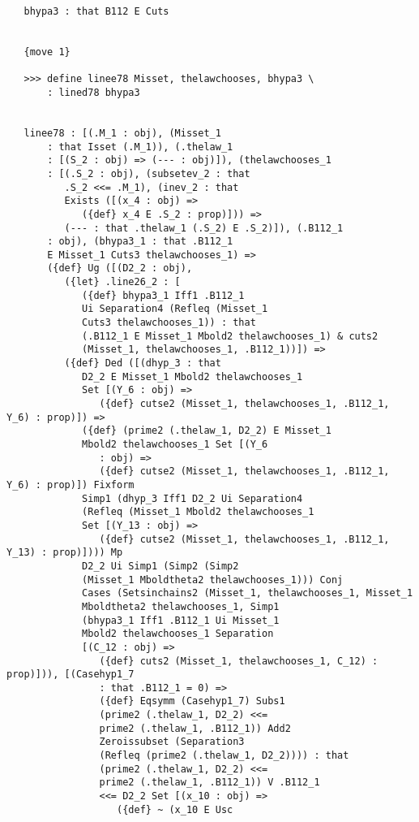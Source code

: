 \documentclass[12pt]{article}
\begin{document}
\begin{verbatim}
   bhypa3 : that B112 E Cuts


   {move 1}

   >>> define linee78 Misset, thelawchooses, bhypa3 \
       : lined78 bhypa3


   linee78 : [(.M_1 : obj), (Misset_1 
       : that Isset (.M_1)), (.thelaw_1 
       : [(S_2 : obj) => (--- : obj)]), (thelawchooses_1 
       : [(.S_2 : obj), (subsetev_2 : that 
          .S_2 <<= .M_1), (inev_2 : that 
          Exists ([(x_4 : obj) => 
             ({def} x_4 E .S_2 : prop)])) => 
          (--- : that .thelaw_1 (.S_2) E .S_2)]), (.B112_1 
       : obj), (bhypa3_1 : that .B112_1 
       E Misset_1 Cuts3 thelawchooses_1) => 
       ({def} Ug ([(D2_2 : obj), 
          ({let} .line26_2 : [
             ({def} bhypa3_1 Iff1 .B112_1 
             Ui Separation4 (Refleq (Misset_1 
             Cuts3 thelawchooses_1)) : that 
             (.B112_1 E Misset_1 Mbold2 thelawchooses_1) & cuts2 
             (Misset_1, thelawchooses_1, .B112_1))]) => 
          ({def} Ded ([(dhyp_3 : that 
             D2_2 E Misset_1 Mbold2 thelawchooses_1 
             Set [(Y_6 : obj) => 
                ({def} cutse2 (Misset_1, thelawchooses_1, .B112_1, Y_6) : prop)]) => 
             ({def} (prime2 (.thelaw_1, D2_2) E Misset_1 
             Mbold2 thelawchooses_1 Set [(Y_6 
                : obj) => 
                ({def} cutse2 (Misset_1, thelawchooses_1, .B112_1, Y_6) : prop)]) Fixform 
             Simp1 (dhyp_3 Iff1 D2_2 Ui Separation4 
             (Refleq (Misset_1 Mbold2 thelawchooses_1 
             Set [(Y_13 : obj) => 
                ({def} cutse2 (Misset_1, thelawchooses_1, .B112_1, Y_13) : prop)]))) Mp 
             D2_2 Ui Simp1 (Simp2 (Simp2 
             (Misset_1 Mboldtheta2 thelawchooses_1))) Conj 
             Cases (Setsinchains2 (Misset_1, thelawchooses_1, Misset_1 
             Mboldtheta2 thelawchooses_1, Simp1 
             (bhypa3_1 Iff1 .B112_1 Ui Misset_1 
             Mbold2 thelawchooses_1 Separation 
             [(C_12 : obj) => 
                ({def} cuts2 (Misset_1, thelawchooses_1, C_12) : prop)])), [(Casehyp1_7 
                : that .B112_1 = 0) => 
                ({def} Eqsymm (Casehyp1_7) Subs1 
                (prime2 (.thelaw_1, D2_2) <<= 
                prime2 (.thelaw_1, .B112_1)) Add2 
                Zeroissubset (Separation3 
                (Refleq (prime2 (.thelaw_1, D2_2)))) : that 
                (prime2 (.thelaw_1, D2_2) <<= 
                prime2 (.thelaw_1, .B112_1)) V .B112_1 
                <<= D2_2 Set [(x_10 : obj) => 
                   ({def} ~ (x_10 E Usc 

\end{verbatim}
\end{document}
